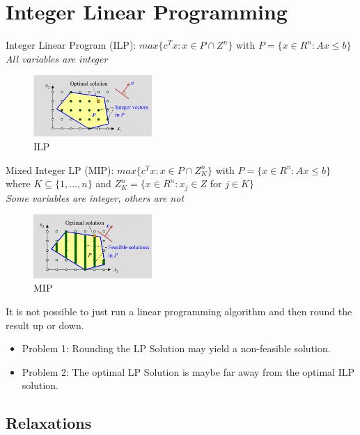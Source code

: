 \section{Integer Linear Programming}

Integer Linear Program (ILP): $max\{c^Tx:x \in P  \cap Z^n\}$ with $P = \{x \in R^n : Ax \leq b\}$ \\
\textit{All variables are integer}

\begin{figure}[H]
\centering
\includegraphics[width=0.4\textwidth]{figures/integerlp.png}
\caption{ILP}
\end{figure}

Mixed Integer LP (MIP): $max\{c^T x:x\in P \cap Z_K^n\}$ with $P = \{x \in R^n : Ax \leq b\}$ where $K  \subseteq \{1, ..., n\}$ and $Z_K^n = \{x \in R^n : x_j \in Z$ for $j \in K\}$ \\
\textit{Some variables are integer, others are not}

\begin{figure}[H]
\centering
\includegraphics[width=0.4\textwidth]{figures/mlp.png}
\caption{MIP}
\end{figure}

It is not possible to just run a linear programming algorithm and then round the result up or down. 
\begin{itemize}
    \item Problem 1: Rounding the LP Solution may yield a non-feasible solution.
    \item Problem 2: The optimal LP Solution is maybe far away from the optimal ILP solution.
\end{itemize}

\clearpage

\subsection{Relaxations}

